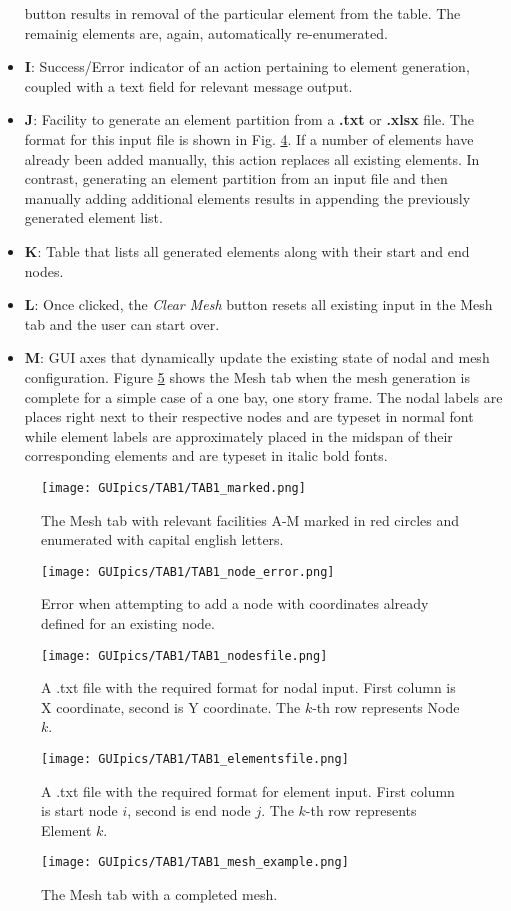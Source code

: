 \begin{itemize}
	button results in removal of the particular element from the table. The 
	remainig elements are, again, automatically re-enumerated.
	\item \textbf{I}: Success/Error indicator of an action pertaining to 
	element generation, coupled with a text field for relevant message output.
	\item \textbf{J}: Facility to generate an element partition from a 
	\textbf{.txt} or \textbf{.xlsx} file. The format for this input file is 
	shown in Fig. \ref{fig:TAB1_elementsfile}. If a number of elements have 
	already been added manually, this action replaces all existing elements. In 
	contrast, generating an element partition from an input file and then 
	manually adding additional elements results in appending the previously 
	generated element list.
	\item \textbf{K}:  Table that lists all generated elements along with their 
	start and end nodes.
	\item \textbf{L}: Once clicked, the \textit{Clear Mesh} button resets all 
	existing input in the Mesh tab and the user can start over.
	\item \textbf{M}: GUI axes that dynamically update the existing state of 
	nodal and mesh configuration. Figure \ref{fig:TAB1_mesh_example} shows the 
	Mesh tab when the mesh generation is complete for a simple case of a one 
	bay, one story frame. The nodal labels are places right next to their 
	respective nodes and are typeset in normal font while element labels are 
	approximately placed in the midspan of their corresponding elements and are 
	typeset in italic bold fonts.
\end{itemize}

\begin{figure}
	\centering
	\texttt{[image: GUIpics/TAB1/TAB1\_marked.png]}
	\caption{The Mesh tab with relevant facilities A-M marked in red circles 
	and enumerated with capital english letters.}
	\label{fig:TAB1_marked}
\end{figure}

\begin{figure}
	\centering
	\texttt{[image: GUIpics/TAB1/TAB1\_node\_error.png]}
	\caption{Error when attempting to add a node with coordinates already 
	defined for an existing node.}
	\label{fig:TAB1_node_error}
\end{figure}

\begin{figure}
	\centering
	\texttt{[image: GUIpics/TAB1/TAB1\_nodesfile.png]}
	\caption{A .txt file with the required format for nodal input. First column 
	is X coordinate, second is Y coordinate. The $k$-th row represents Node 
	$k$.}
	\label{fig:TAB1_nodesfile}
\end{figure}
\begin{figure}
	\centering
	\texttt{[image: GUIpics/TAB1/TAB1\_elementsfile.png]}
	\caption{A .txt file with the required format for element input. First 
	column is start node $i$, second is end node $j$. The $k$-th row represents 
	Element $k$.}
	\label{fig:TAB1_elementsfile}
\end{figure}

\begin{figure}
	\centering
	\texttt{[image: GUIpics/TAB1/TAB1\_mesh\_example.png]}
	\caption{The Mesh tab with a completed mesh.}
	\label{fig:TAB1_mesh_example}
\end{figure}


